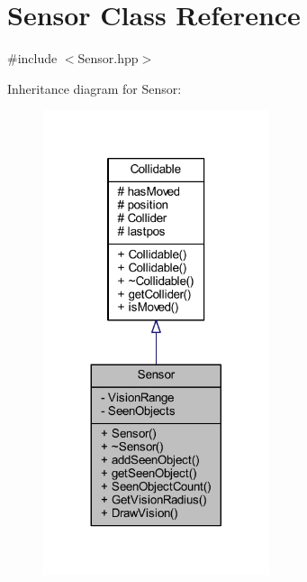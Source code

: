 \hypertarget{class_sensor}{\section{Sensor Class Reference}
\label{class_sensor}
}


{\ttfamily \#include $<$Sensor.\-hpp$>$}



Inheritance diagram for Sensor\-:
\nopagebreak
\begin{figure}[H]
\begin{center}
\leavevmode
\includegraphics[width=188pt]{class_sensor__inherit__graph}
\end{center}
\end{figure}


